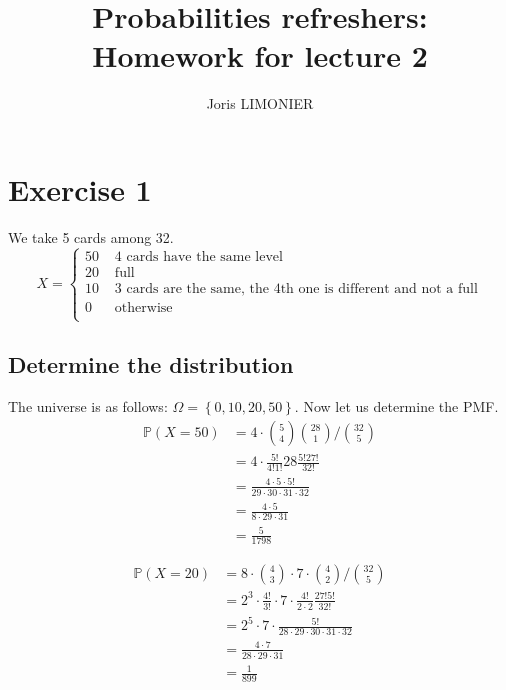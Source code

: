 \documentclass{article}
\title{Probabilities refreshers:\\Homework for lecture 2}
\author{Joris LIMONIER}
\renewcommand{\P}{\mathbb{P}}
\begin{document}
\maketitle

\section{Exercise 1}
We take 5 cards among 32.
\[
    X =
    \begin{cases}
        50 & \text{ 4 cards have the same level}                                   \\
        20 & \text{ full}                                                          \\
        10 & \text{ 3 cards are the same, the 4th one is different and not a full} \\
        0  & \text{ otherwise}                                                     \\
    \end{cases}
\]

\subsection{Determine the distribution}
The universe is as follows: \(\Omega = \left\{ 0, 10, 20, 50 \right\}\). Now let us determine the PMF.
\begin{align*}
    \P (X=50)
     & = 4 \cdot {5 \choose 4} {28 \choose 1} / {32 \choose 5}    \\
     & = 4 \cdot \frac{5!}{4!1!} 28 \frac{5!27!}{32!}             \\
     & = \frac{4 \cdot 5 \cdot 5!}{29 \cdot 30 \cdot 31 \cdot 32} \\
     & = \frac{4 \cdot 5}{8 \cdot 29 \cdot 31}                    \\
     & = \frac{5}{1798}
\end{align*}

\begin{align*}
    \P (X=20)
     & = 8 \cdot {4 \choose 3} \cdot 7 \cdot {4 \choose 2} / {32 \choose 5}           \\
     & = 2^3 \cdot \frac{4!}{3!} \cdot 7 \cdot \frac{4!}{2 \cdot 2} \frac{27!5!}{32!} \\
     & = 2^5 \cdot 7 \cdot \frac{5!}{28 \cdot 29 \cdot 30 \cdot 31 \cdot 32}          \\
     & = \frac{4 \cdot 7}{28 \cdot 29 \cdot 31}                                       \\
     & = \frac{1}{899}                                                                \\
\end{align*}
\end{document}
